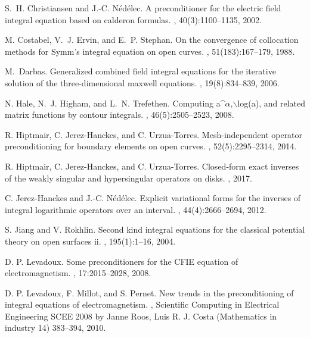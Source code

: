 \documentclass[a4paper]{article}
\begin{document}
\begin{thebibliography}{10}
S.~H. Christiansen and J.-C. N{\'e}d{\'e}lec.
\newblock A preconditioner for the electric field integral equation based on
  calderon formulas.
, 40(3):1100--1135, 2002.

M. Costabel, V.~J. Ervin, and E.~P. Stephan.
\newblock On the convergence of collocation methods for Symm's integral
  equation on open curves.
, 51(183):167--179, 1988.

M.~Darbas.
\newblock Generalized combined field integral equations for the iterative
  solution of the three-dimensional maxwell equations.
, 19(8):834--839, 2006.

N. Hale, N.~J. Higham, and L.~N. Trefethen.
\newblock Computing a\^{}$\alpha$,$\backslash$log(a), and related matrix
  functions by contour integrals.
, 46(5):2505--2523, 2008.

R. Hiptmair, C. Jerez-Hanckes, and C. Urzua-Torres.
\newblock Mesh-independent operator preconditioning for boundary elements on
  open curves.
, 52(5):2295--2314, 2014.

R. Hiptmair, C. Jerez-Hanckes, and C. Urzua-Torres.
\newblock Closed-form exact inverses of the weakly singular and hypersingular
  operators on disks.
, 2017.

C. Jerez-Hanckes and J.-C. N{\'e}d{\'e}lec.
\newblock Explicit variational forms for the inverses of integral logarithmic
  operators over an interval.
, 44(4):2666--2694, 2012.

S. Jiang and V. Rokhlin.
\newblock Second kind integral equations for the classical potential theory on
  open surfaces ii.
, 195(1):1--16, 2004.

{D. P.} Levadoux.
\newblock Some preconditioners for the {CFIE} equation of electromagnetism.
, 17:2015--2028, 2008.

{D. P.} Levadoux, {F.} Millot, and {S.} Pernet.
\newblock New trends in the preconditioning of integral equations of electromagnetism.
, Scientific Computing in Electrical Engineering SCEE 2008 by Janne Roos, Luis R. J. Costa
(Mathematics in industry 14) 383--394, 2010.


\end{thebibliography}
\end{document}
